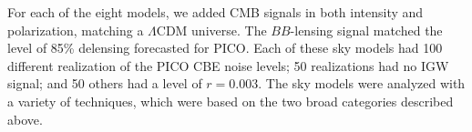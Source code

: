 \documentclass[PICOReport.tex]{subfiles}
\begin{document}



For each of the eight models, we added CMB signals in both intensity and polarization, matching a $\Lambda$CDM universe. The $BB$-lensing signal matched the level of 85\% delensing forecasted for PICO. Each of these sky models had 100 different realization of the PICO CBE noise levels; 50 realizations had no \ac{IGW} signal; and 50 others had a level of $r=0.003$. 
The sky models were analyzed with a variety of techniques, which were based on the two broad categories described above. 

\end{document}
